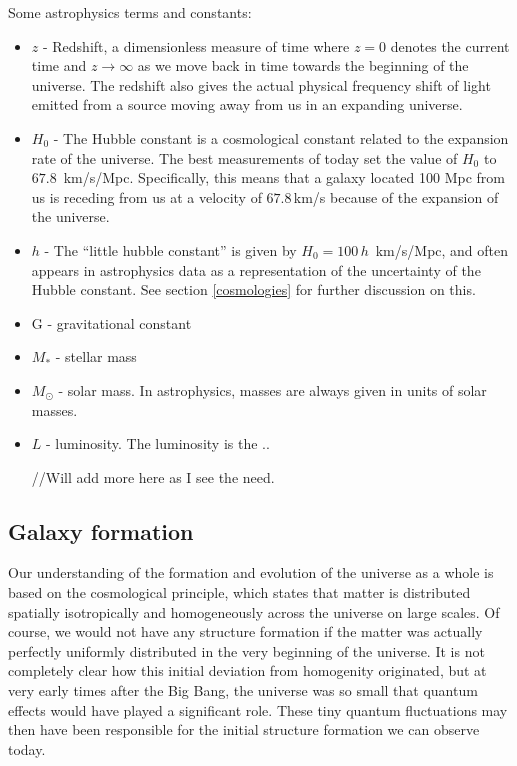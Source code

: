 Some astrophysics terms and constants:

\begin{itemize}
    \item $z$ - Redshift, a dimensionless measure of time where $z=0$ denotes the current time and $z \rightarrow \infty$ as we move back in time towards the beginning of the universe. The redshift also gives the actual physical frequency shift of light emitted from a source moving away from us in an expanding universe.
    \item $H_{0}$ - The Hubble constant is a cosmological constant related to the expansion rate of the universe. The best measurements of today set the value of $H_0$ to $67.8\, $ km/s/Mpc. Specifically, this means that a galaxy located 100 Mpc from us is receding from us at a velocity of $67.8\,$km/s because of the expansion of the universe.
    \item $h$ - The ``little hubble constant'' is given by $H_0 = 100\,h\,$ km/s/Mpc, and often appears in astrophysics data as a representation of the uncertainty of the Hubble constant. See section \ref{cosmologies} for further discussion on this.
    \item G - gravitational constant
    \item $M_{*}$ - stellar mass
    \item $M_{\odot}$ - solar mass. In astrophysics, masses are always given in units of solar masses.
    \item $L$ - luminosity. The luminosity is the ..

//Will add more here as I see the need.

\end{itemize}

\subsection{Galaxy formation}

Our understanding of the formation and evolution of the universe as a whole is based on the cosmological principle, which states that matter is distributed spatially isotropically and homogeneously across the universe on large scales. Of course, we would not have any structure formation if the matter was actually perfectly uniformly distributed in the very beginning of the universe. It is not completely clear how this initial deviation from homogenity originated, but at very early times after the Big Bang, the universe was so small that quantum effects would have played a significant role. These tiny quantum fluctuations may then have been responsible for the initial structure formation we can observe today.

